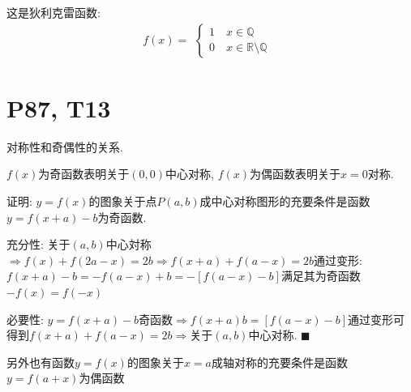 \documentclass{book}
\begin{document}
    这是\textcolor[rgb]{0.38,0.11,0.2}{狄利克雷函数}:
    $$
    f(x)=\begin{array}{l} 
            \left\{\begin{matrix} 
            1 \quad x \in \mathbb{Q} \\ 
            0 \quad x \in \mathbb{R} \setminus \mathbb{Q} \
          \end{matrix}\right.    
        \end{array} 
    $$

    \section{\textcolor[rgb]{0.11,0.65,0.52}{P87, T13}}
    \textcolor[rgb]{0.38,0.11,0.2}{对称性}和\textcolor[rgb]{0.38,0.11,0.2}{奇偶性}的关系.

    $f(x)$为奇函数表明关于$(0,0)$中心对称, $f(x)$为偶函数表明关于$x=0$对称.

    \begin{boxB}
        证明: $y=f(x)$的图象关于点$P(a,b)$成中心对称图形的充要条件是函数$y=f(x+a)-b$为奇函数.
    \end{boxB}

    \textcolor[rgb]{0.75,0.17,0.22}{充分性}:
        关于$(a,b)$中心対称$\Longrightarrow f(x)+f(2a-x)=2b\Longrightarrow f(x+a)+f(a-x)=2b$通过变形:$f(x+a)-b=-f(a-x)+b=-[f(a-x)-b]$满足其为奇函数$-f(x)=f(-x)$

    \textcolor[rgb]{0.75,0.17,0.22}{必要性}:
    $y=f(x+a)-b$奇函数$\Longrightarrow f(x+a)b=[f(a-x)-b]$通过变形可得到$f(x+a)+f(a-x)=2b$$\Longrightarrow$关于$(a,b)$中心对称. $\blacksquare$

    另外也有函数$y=f(x)$的图象关于$x=a$成轴对称的充要条件是函数$y=f(a+x)$为偶函数
\end{document}
